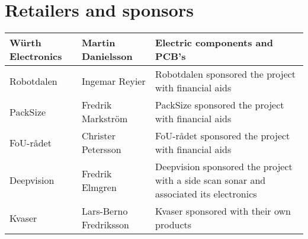 \section{Retailers and sponsors}
\begin{table}[h]
\begin{tabularx}{\textwidth}{|l|l|X|}
\hline 
Würth Electronics & Martin Danielsson & Electric components and PCB's \\ 
\hline 
Robotdalen & Ingemar Reyier & Robotdalen sponsored the project with financial aids \\ 
\hline 
PackSize & Fredrik Markström &  PackSize sponsored the project with financial aids \\ 
\hline 
FoU-rådet & Christer Petersson &  FoU-rådet sponsored the project with financial aids \\ 
\hline 
Deepvision & Fredrik Elmgren &  Deepvision sponsored the project with a side scan sonar and associated its electronics \\ 
\hline 
Kvaser & Lars-Berno Fredriksson &  Kvaser sponsored with their own products\\ 
\hline 
\end{tabularx}
\end{table}

